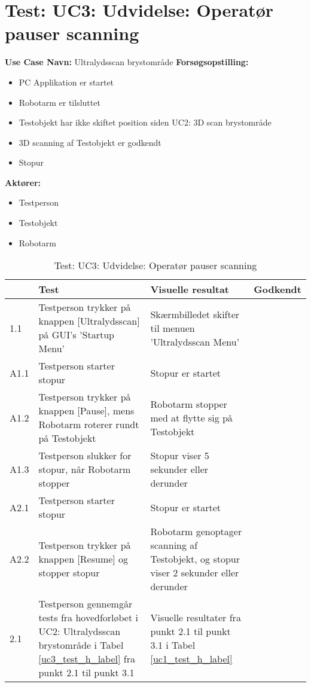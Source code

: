 \section{Test: UC3: Udvidelse: Operatør pauser scanning}
\textbf{Use Case Navn:} Ultralydsscan brystområde \newline
\textbf{Forsøgsopstilling:}
\begin{itemize}
\item PC Applikation er startet
\item Robotarm er tilsluttet
\item Testobjekt har ikke skiftet position siden UC2: 3D scan brystområde
\item 3D scanning af Testobjekt er godkendt
\item Stopur
\end{itemize}  
\textbf{Aktører:}
\begin{itemize}
\item Testperson
\item Testobjekt
\item Robotarm
\end{itemize}  

\begin{table}[htb]
\begin{tabularx}{\textwidth}{|p{0.7cm}|X|X|p{2cm}|}
\hline
\textbf{} & \textbf{Test} & \textbf{Visuelle resultat} &\textbf{Godkendt} \\ \hline
1.1 & Testperson trykker på knappen [Ultralydsscan] på GUI's 'Startup Menu' & Skærmbilledet skifter til menuen 'Ultralydsscan Menu' & \\ \hline
A1.1 & Testperson starter stopur & Stopur er startet & \\\hline
A1.2 & Testperson trykker på knappen [Pause], mens Robotarm roterer rundt på Testobjekt & Robotarm stopper med at flytte sig på Testobjekt & \\\hline
A1.3 & Testperson slukker for stopur, når Robotarm stopper & Stopur viser 5 sekunder eller derunder & \\\hline
A2.1 & Testperson starter stopur & Stopur er startet & \\\hline
A2.2 & Testperson trykker på knappen [Resume] og stopper stopur & Robotarm genoptager scanning af Testobjekt, og stopur viser 2 sekunder eller derunder & \\\hline 
2.1 & Testperson gennemgår tests fra hovedforløbet i UC2: Ultralydsscan brystområde i Tabel \ref{uc3_test_h_label} fra punkt 2.1 til punkt 3.1  & Visuelle resultater fra punkt 2.1 til punkt 3.1 i Tabel \ref{uc1_test_h_label} & \\ \hline
\end{tabularx}
    \caption{Test: UC3: Udvidelse: Operatør pauser scanning} 
    \label{uc3_test_e_1_label}  
\end{table}
\newpage


